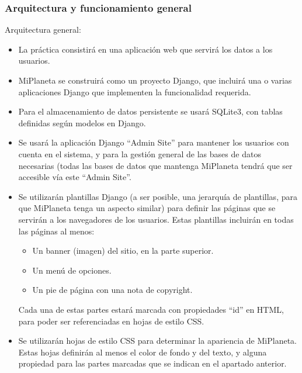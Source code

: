 \subsubsection{Arquitectura y funcionamiento general}

Arquitectura general:

\begin{itemize}
\item La práctica consistirá en una aplicación web que servirá los datos a los usuarios.

\item MiPlaneta se construirá como un proyecto Django, que incluirá una o varias aplicaciones Django que implementen la funcionalidad requerida.

\item Para el almacenamiento de datos persistente se usará SQLite3, con tablas definidas según modelos en Django.

\item Se usará la aplicación Django ``Admin Site'' para mantener los usuarios con cuenta en el sistema, y para la gestión general de las bases de datos necesarias (todas las bases de datos que mantenga MiPlaneta tendrá que ser accesible vía este ``Admin Site''.

\item Se utilizarán plantillas Django (a ser posible, una jerarquía de plantillas, para que MiPlaneta tenga un aspecto similar) para definir las páginas que se servirán a los navegadores de los usuarios. Estas plantillas incluirán en todas las páginas al menos:
  \begin{itemize}
  \item Un banner (imagen) del sitio, en la parte superior.
  \item Un menú de opciones.
  \item Un pie de página con una nota de copyright.
  \end{itemize}

Cada una de estas partes estará marcada con propiedades ``id'' en HTML, para poder ser referenciadas en hojas de estilo CSS.

\item Se utilizarán hojas de estilo CSS para determinar la apariencia de MiPlaneta. Estas hojas definirán al menos el color de fondo y del texto, y alguna propiedad para las partes marcadas que se indican en el apartado anterior.
\end{itemize}

